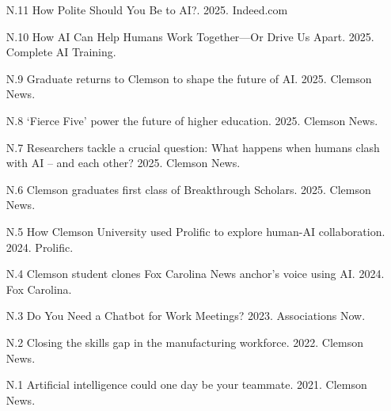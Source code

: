 \begin{itemize}[align=left, labelwidth=3em,]
\setlength\itemsep{1em}


  \item [N.11] How Polite Should You Be to AI?. 2025. Indeed.com
  \item [N.10] How AI Can Help Humans Work Together—Or Drive Us Apart. 2025. Complete AI Training.
  \item [N.9] Graduate returns to Clemson to shape the future of AI. 2025. Clemson News.
  \item [N.8] ‘Fierce Five’ power the future of higher education. 2025. Clemson News.
  \item [N.7] Researchers tackle a crucial question: What happens when humans clash with AI – and each other? 2025. Clemson News.
  \item [N.6] Clemson graduates first class of Breakthrough Scholars. 2025. Clemson News.
  \item [N.5] How Clemson University used Prolific to explore human-AI collaboration. 2024. Prolific.
  \item [N.4] Clemson student clones Fox Carolina News anchor’s voice using AI. 2024. Fox Carolina.
  \item [N.3] Do You Need a Chatbot for Work Meetings? 2023. Associations Now.
  \item [N.2] Closing the skills gap in the manufacturing workforce. 2022. Clemson News.
  \item [N.1] Artificial intelligence could one day be your teammate. 2021. Clemson News.

\end{itemize}

